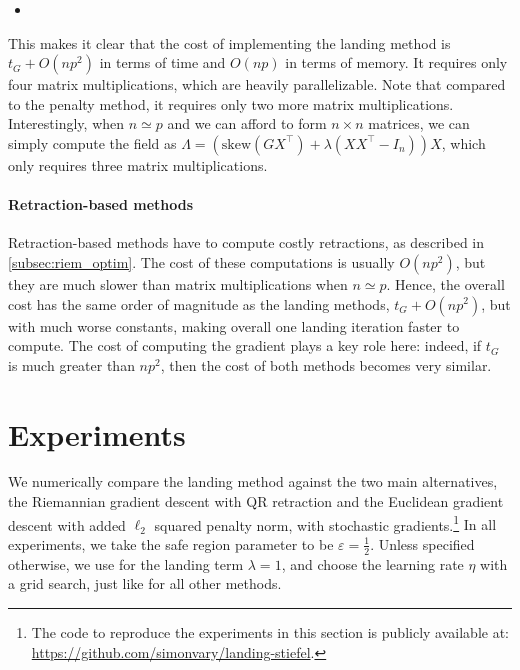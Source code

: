 \documentclass[twoside,11pt]{article}
\newcommand{\finalrevision}[1]{{#1}}
\begin{document}
{\begin{itemize}
        \item {}   
    \end{itemize}
    This makes it clear that the cost of implementing the landing method is $t_G + O(np^2)$ in terms of time and $O(np)$ in terms of memory. It requires only four matrix multiplications, which are heavily parallelizable. Note that compared to the penalty method, it requires only two more matrix multiplications. 
    Interestingly, when $n \simeq p$ and we can afford to form $n\times n$ matrices, we can simply compute the field as $\Lambda = \left(\mathrm{skew}(GX^\top) +\lambda (XX^\top - I_n)\right)X$, which only requires three matrix multiplications.
    \paragraph{Retraction-based methods}
    Retraction-based methods have to compute costly retractions, as described in \autoref{subsec:riem_optim}.
    The cost of these computations is usually $O(np^2)$, but they are much slower than matrix multiplications when $n\simeq p$. Hence, the overall cost has the same order of magnitude as the landing methods, $t_G + O(np^2)$, but with much worse constants, making overall one landing iteration faster to compute. 
    The cost of computing the gradient plays a key role here: indeed, if $t_G$ is much greater than $np^2$, then the cost of both methods becomes very similar. 
}

\section{Experiments} \label{sec:experiments}

We numerically compare the landing method against the two main alternatives, the Riemannian gradient descent with QR retraction and the Euclidean gradient descent with added $\ell_2$ squared penalty norm, with stochastic gradients.\footnote{The code to reproduce the experiments in this section is publicly available at: \url{https://github.com/simonvary/landing-stiefel}.}
\finalrevision{In all experiments, we take the safe region parameter to be $\varepsilon = \frac12$. Unless specified otherwise, we use for the landing term $\lambda =1$, and choose the learning rate $\eta$ with a grid search, just like for all other methods.}

%
%
\end{document}
